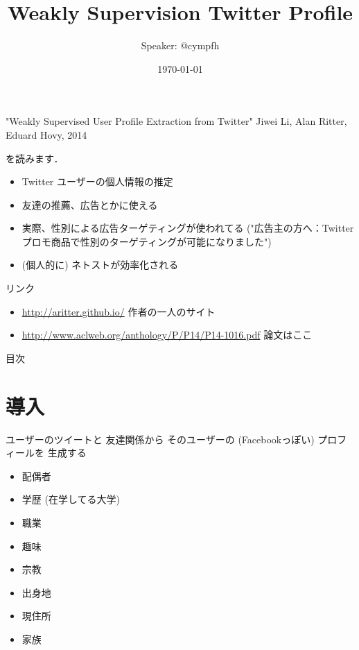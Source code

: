 \documentclass[12pt, dvipdfmx, default, cjk]{beamer}
\title{Weakly Supervision Twitter Profile}
\author{Speaker: @cympfh}
\date{\today}
\begin{document}
\begin{frame} \titlepage \end{frame}

\begin{frame}
  "Weakly Supervised User Profile Extraction from Twitter"
  Jiwei Li, Alan Ritter, Eduard Hovy, 2014

  を読みます．

  \vfill

  \begin{itemize}
    \item<2-> Twitter ユーザーの個人情報の推定
    \item<3-> 友達の推薦、広告とかに使える
    \item<4-> 実際、性別による広告ターゲティングが使われてる
      ("広告主の方へ：Twitterプロモ商品で性別のターゲティングが可能になりました")
    \item<5-> (個人的に) ネトストが効率化される
  \end{itemize}
\end{frame}

\begin{frame}{リンク}
\begin{itemize}
\item
  \url{http://aritter.github.io/}
  作者の一人のサイト
  \item
  \url{http://www.aclweb.org/anthology/P/P14/P14-1016.pdf}
  論文はここ
  \end{itemize}
\end{frame}

\begin{frame}{目次}
  \tableofcontents
\end{frame}

\section{導入}

\begin{frame}
  ユーザーのツイートと
  友達関係から
  そのユーザーの
  (Facebookっぽい)
  プロフィールを
  生成する
  \begin{itemize}
    \item<1-2> 配偶者
    \item<1-2> 学歴 (在学してる大学)
    \item<1-2> 職業
    \item<-1> 趣味
    \item<-1> 宗教
    \item<-1> 出身地
    \item<-1> 現住所
    \item<-1> 家族
  \end{itemize}
\end{frame}
\end{document}
